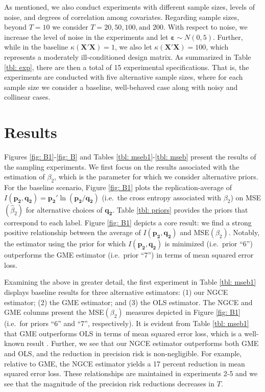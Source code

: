 \documentclass{elsarticle}
\begin{document}
As mentioned, we also conduct experiments with different sample sizes, 
levels of noise, and degrees of correlation among covariates.
Regarding sample sizes, beyond $T=10$ we consider $T=20, 50, 100, 
\text{and } 200$. 
With respect to noise, we increase the level of noise in the experiments and 
let $\mathbf{\varepsilon}\sim N(0,5)$.
Further, while in the baseline $\kappa(\mathbf{X}'\mathbf{X})=1$, we
also let $\kappa(\mathbf{X}'\mathbf{X})=100$, which represents a 
moderately ill-conditioned design matrix.
As summarized in Table \ref{tbl: exp}, there are then a total of 15 
experimental specifications. 
That is, the experiments are conducted with five alternative sample sizes, 
where for each sample size we consider a baseline, well-behaved case along
with noisy and collinear cases.


\section{Results}
\label{sec: results}

Figures \ref{fig: B1}-\ref{fig: B} and Tables \ref{tbl: mseb1}-\ref{tbl: mseb} 
present the results of the sampling experiments.
We first focus on the results associated with the estimation of $\beta_2$, which 
is the parameter for which we consider alternative priors.
For the baseline scenario, Figure \ref{fig: B1} plots the replication-average of 
$I(\mathbf{p_2}, \mathbf{q_2}) = \mathbf{p_2}'\ln (\mathbf{p_2}/
\mathbf{q_2})$ (i.e.\ the cross entropy associated with $\beta_2$) on 
MSE$(\hat{\beta}_2)$  for alternative choices of $\mathbf{q_2}$.
Table \ref{tbl: priors} provides the priors that correspond to each label.
Figure \ref{fig: B1} depicts a core result: we find a strong positive 
relationship between the average of $I(\mathbf{p_2}, \mathbf{q_2})$ 
and MSE$(\beta_2)$.
Notably, the estimator using the prior for which $I(\mathbf{p_2}, 
\mathbf{q_2})$ is minimized (i.e.\ prior ``6'') outperforms the GME 
estimator (i.e.\ prior ``7'') in terms of mean squared error loss.

Examining the above in greater detail, the first experiment in Table 
\ref{tbl: mseb1} displays baseline results for three alternative estimators: 
(1) our NGCE estimator; (2) the GME estimator; and (3) the OLS 
estimator.
The NGCE and GME columns present the MSE$(\beta_2)$ measures 
depicted in Figure \ref{fig: B1} (i.e.\ for priors ``6'' and ``7'', respectively).
It is evident from Table \ref{tbl: mseb1} that GME outperforms OLS in 
terms of mean squared error loss, which is a well-known result 
\citep{golan1996}. 
Further, we see that our NGCE estimator outperforms both GME and OLS,
and the reduction in precision risk is non-negligible.
For example, relative to GME, the NGCE estimator yields a 17 percent 
reduction in mean squared error loss.
These relationships are maintained in experiments 2-5 and we see that 
the magnitude of the precision risk reductions decreases in $T$.
\end{document}
